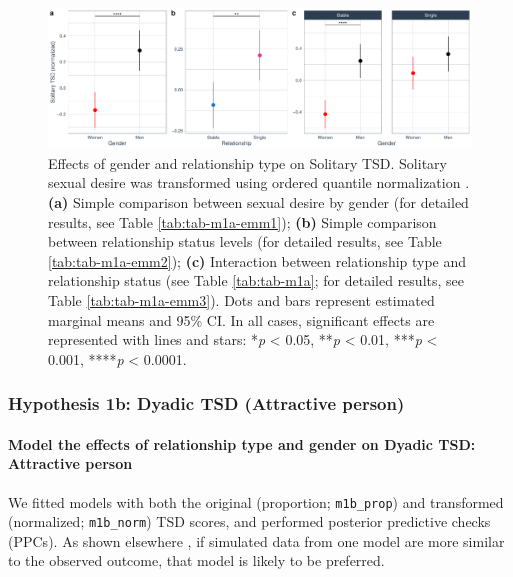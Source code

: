 \documentclass[
  bookmarksnumbered]{article}
\begin{document}
\begin{figure}
\centering
\includegraphics{Sexual_Desire_Arousal_anonymous_files/figure-latex/fig-h1a-1.pdf}
\caption{\label{fig:fig-h1a}Effects of gender and relationship type on Solitary TSD. Solitary sexual desire was transformed using ordered quantile normalization \autocite{petersonOrderedQuantileNormalization2020a}. \textbf{(a)} Simple comparison between sexual desire by gender (for detailed results, see Table \ref{tab:tab-m1a-emm1}); \textbf{(b)} Simple comparison between relationship status levels (for detailed results, see Table \ref{tab:tab-m1a-emm2}); \textbf{(c)} Interaction between relationship type and relationship status (see Table \ref{tab:tab-m1a}; for detailed results, see Table \ref{tab:tab-m1a-emm3}). Dots and bars represent estimated marginal means and 95\% CI. In all cases, significant effects are represented with lines and stars: *\emph{p} \textless{} 0.05, **\emph{p} \textless{} 0.01, ***\emph{p} \textless{} 0.001, ****\emph{p} \textless{} 0.0001.}
\end{figure}

\subsubsection{Hypothesis 1b: Dyadic TSD (Attractive person)}\label{hypothesis1b}

\paragraph{Model the effects of relationship type and gender on Dyadic TSD: Attractive person}\label{model-the-effects-of-relationship-type-and-gender-on-dyadic-tsd-attractive-person}

We fitted models with both the original (proportion; \texttt{m1b\_prop}) and transformed (normalized; \texttt{m1b\_norm}) TSD scores, and performed posterior predictive checks (PPCs). As shown elsewhere \autocite[e.g.,][]{gabryVisualizationBayesianWorkflow2019}, if simulated data from one model are more similar to the observed outcome, that model is likely to be preferred.
\end{document}
